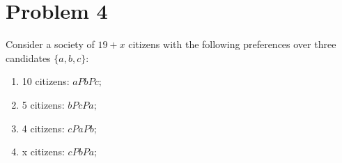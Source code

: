 \documentclass[11pt]{article}
\begin{document}
\newpage
\section*{Problem 4}
\begin{problem}
    
Consider a society of $19 + x$ citizens with the following preferences over three candidates
$\{a, b, c\}$:
\begin{enumerate}
\item 10 citizens: $a P b P c;$
\item 5 citizens: $b P c P a;$
\item 4 citizens: $c P a P b;$
\item x citizens: $c P b P a;$
\end{enumerate}
\end{problem}
\end{document}
